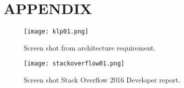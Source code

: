 \documentclass[a4paper, 10pt, conference]{IEEEtran}
\begin{document}
\addtolength{\textheight}{-12cm}
\onecolumn
\section{APPENDIX}
\begin{figure}[H]
  \centering
    \texttt{[image: klp01.png]}
  \caption{Screen shot from architecture requirement.}
  \label{fig:klp}
\end{figure}
\begin{figure}
  \centering
    \texttt{[image: stackoverflow01.png]}
  \caption{Screen shot Stack Overflow 2016 Developer report.}
  \label{fig:so}
\end{figure}
\newpage
\twocolumn
\end{document}
